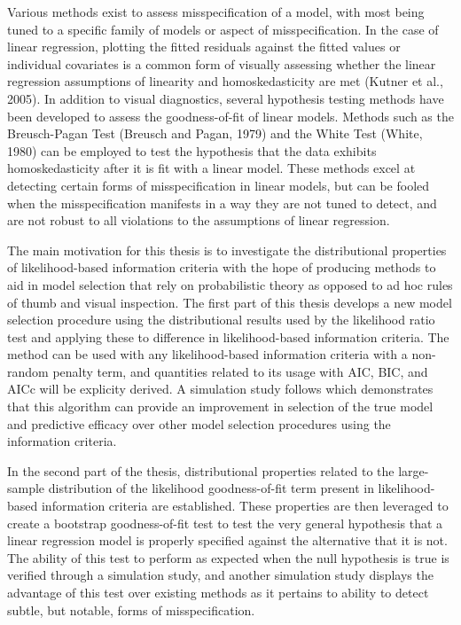 		Various methods exist to assess misspecification of a model, with most being tuned to a specific family of models or aspect of misspecification. In the case of linear regression,
		plotting the fitted residuals against the fitted values or individual covariates is a common form of visually assessing whether the linear regression assumptions of linearity and
		homoskedasticity are met (Kutner et al., 2005). In addition to visual diagnostics, several hypothesis testing methods have been developed to assess the goodness-of-fit of linear
		models. Methods such as the Breusch-Pagan Test (Breusch and Pagan, 1979) and the White Test (White, 1980) can be employed to test the hypothesis that the data exhibits homoskedasticity
		after it is fit with a linear model. These methods excel at detecting certain forms of misspecification in linear models, but can be fooled when the misspecification manifests in a
		way they are not tuned to detect, and are not robust to all violations to the assumptions of linear regression.

		The main motivation for this thesis is to investigate the distributional properties of likelihood-based information criteria with the hope of producing methods to aid in model selection
		that rely on probabilistic theory as opposed to ad hoc rules of thumb and visual inspection. The first part of this thesis develops a new model selection procedure using the distributional
		results used by the likelihood ratio test and applying these to difference in likelihood-based information criteria. The method can be used with any likelihood-based information criteria
		with a non-random penalty term, and quantities related to its usage with AIC, BIC, and AICc will be explicity derived. A simulation study follows which demonstrates that this algorithm
		can provide an improvement in selection of the true model and predictive efficacy over other model selection procedures using the information criteria.
		
		In the second part of the thesis, distributional properties related to the large-sample distribution of the likelihood goodness-of-fit term present in likelihood-based information criteria
		are established. These properties are then leveraged to create a bootstrap goodness-of-fit test to test the very general hypothesis that a linear regression model is properly specified
		against the alternative that it is not. The ability of this test to perform as expected when the null hypothesis is true is verified through a simulation study, and another simulation
		study displays the advantage of this test over existing methods as it pertains to ability to detect subtle, but notable, forms of misspecification.

